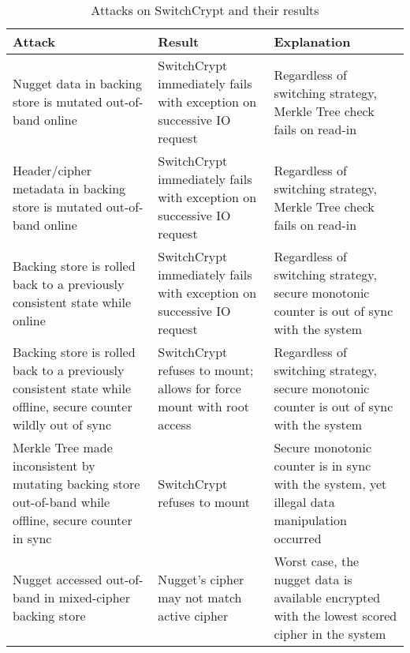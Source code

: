 \begin{table}[t]
  \caption{Attacks on SwitchCrypt and their results}\label{tbl:security}
  \footnotesize
  \centering
  \begin{tabu} to \linewidth { | X[l] | X[c] | X[c] | }
    \hline
    \textbf{Attack} & \textbf{Result} & \textbf{Explanation} \\
    \hline\hline
    Nugget data in backing store is mutated out-of-band online &
    SwitchCrypt immediately fails with exception on successive IO request &
    Regardless of switching strategy, Merkle Tree check fails on read-in\\
    \hline
    Header/cipher metadata in backing store is mutated out-of-band online &
    SwitchCrypt immediately fails with exception on successive IO request &
    Regardless of switching strategy, Merkle Tree check fails on read-in\\
    \hline
    Backing store is rolled back to a previously consistent state while online &
    SwitchCrypt immediately fails with exception on successive IO request &
    Regardless of switching strategy, secure monotonic counter is out of sync
    with the system\\
    \hline
    Backing store is rolled back to a previously consistent state while offline,
    secure counter wildly out of sync & SwitchCrypt refuses to mount; allows for
    force mount with root access & Regardless of switching strategy, secure
    monotonic counter is out of sync with the system\\
    \hline
    Merkle Tree made inconsistent by mutating backing store out-of-band while
    offline, secure counter in sync & SwitchCrypt refuses to mount & Secure
    monotonic counter is in sync with the system, yet illegal data manipulation
    occurred\\
    \hline
    Nugget accessed out-of-band in mixed-cipher backing store & Nugget's cipher
    may not match active cipher & Worst case, the nugget data is available
    encrypted with the lowest scored cipher in the system\\
    \hline\hline
  \end{tabu}
\end{table}
